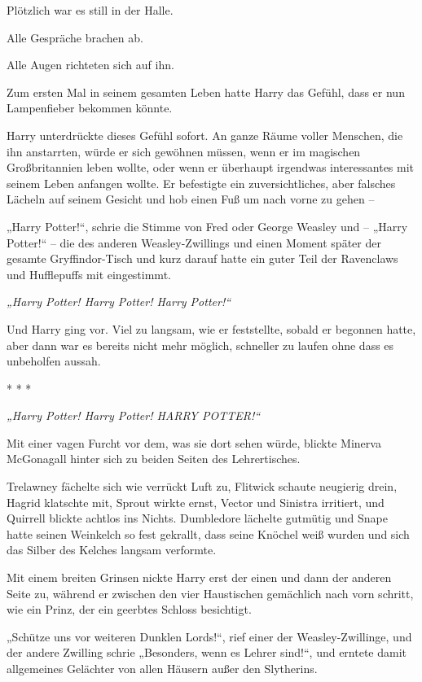 {Plötzlich war es still in der Halle.

Alle Gespräche brachen ab.

Alle Augen richteten sich auf ihn.

Zum ersten Mal in seinem gesamten Leben hatte Harry das Gefühl, dass er nun Lampenfieber bekommen könnte.

Harry unterdrückte dieses Gefühl sofort. An ganze Räume voller Menschen, die ihn anstarrten, würde er sich gewöhnen müssen, wenn er im magischen Großbritannien leben wollte, oder wenn er überhaupt irgendwas interessantes mit seinem Leben anfangen wollte. Er befestigte ein zuversichtliches, aber falsches Lächeln auf seinem Gesicht und hob einen Fuß um nach vorne zu gehen --

„Harry Potter!“, schrie die Stimme von Fred oder George Weasley und -- „Harry Potter!“ -- die des anderen Weasley-Zwillings und einen Moment später der gesamte Gryffindor-Tisch und kurz darauf hatte ein guter Teil der Ravenclaws und Hufflepuffs mit eingestimmt.

\emph{„Harry Potter! Harry Potter! Harry Potter!“}

Und Harry ging vor. Viel zu langsam, wie er feststellte, sobald er begonnen hatte, aber dann war es bereits nicht mehr möglich, schneller zu laufen ohne dass es unbeholfen aussah.

* * *

\emph{„Harry Potter! Harry Potter! HARRY POTTER!“}

Mit einer vagen Furcht vor dem, was sie dort sehen würde, blickte Minerva McGonagall hinter sich zu beiden Seiten des Lehrertisches.

Trelawney fächelte sich wie verrückt Luft zu, Flitwick schaute neugierig drein, Hagrid klatschte mit, Sprout wirkte ernst, Vector und Sinistra irritiert, und Quirrell blickte achtlos ins Nichts. Dumbledore lächelte gutmütig und Snape hatte seinen Weinkelch so fest gekrallt, dass seine Knöchel weiß wurden und sich das Silber des Kelches langsam verformte.

Mit einem breiten Grinsen nickte Harry erst der einen und dann der anderen Seite zu, während er zwischen den vier Haustischen gemächlich nach vorn schritt, wie ein Prinz, der ein geerbtes Schloss besichtigt.

„Schütze uns vor weiteren Dunklen Lords!“, rief einer der Weasley-Zwillinge, und der andere Zwilling schrie „Besonders, wenn es Lehrer sind!“, und erntete damit allgemeines Gelächter von allen Häusern außer den Slytherins.

}
